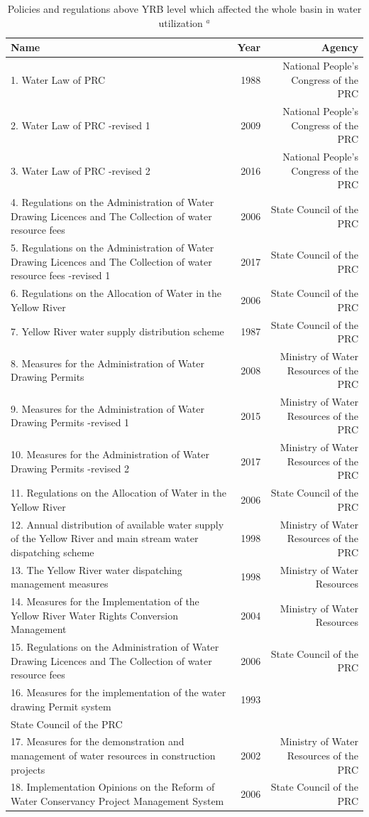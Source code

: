 \documentclass[9pt,twoside,lineno]{pnas-new}
\begin{document}
\begin{table}\centering
    \caption{Policies and regulations above YRB level which affected the whole basin in water utilization $^a$}
    
    \begin{tabular}{lrr}
    Name & Year & Agency \\
    \midrule
    1. Water Law of PRC & 1988 & National People's Congress of the PRC \\
    2. Water Law of PRC -revised 1 & 2009 & National People's Congress of the PRC \\
    3. Water Law of PRC -revised 2 & 2016 & National People's Congress of the PRC \\
    4. Regulations on the Administration of Water Drawing Licences and The Collection of water resource fees & 2006 & State Council of the PRC \\
    5. Regulations on the Administration of Water Drawing Licences and The Collection of water resource fees -revised 1 & 2017 & State Council of the PRC \\
    6. Regulations on the Allocation of Water in the Yellow River & 2006 & State Council of the PRC \\
    7. Yellow River water supply distribution scheme & 1987 & State Council of the PRC \\
    8. Measures for the Administration of Water Drawing Permits & 2008 & Ministry of Water Resources of the PRC \\
    9. Measures for the Administration of Water Drawing Permits -revised 1 & 2015 & Ministry of Water Resources of the PRC \\
    10. Measures for the Administration of Water Drawing Permits -revised 2 & 2017 & Ministry of Water Resources of the PRC \\
    11. Regulations on the Allocation of Water in the Yellow River & 2006 & State Council of the PRC \\
    12. Annual distribution of available water supply of the Yellow River and main stream water dispatching scheme & 1998 & Ministry of Water Resources of the PRC \\
    13. The Yellow River water dispatching management measures & 1998 & Ministry of Water Resources \\
    14. Measures for the Implementation of the Yellow River Water Rights Conversion Management & 2004 & Ministry of Water Resources \\
    15. Regulations on the Administration of Water Drawing Licences and The Collection of water resource fees & 2006 & State Council of the PRC \\
    16. Measures for the implementation of the water drawing Permit system & 1993 \\ State Council of the PRC \\
    17. Measures for the demonstration and management of water resources in construction projects & 2002 & Ministry of Water Resources of the PRC \\
    18. Implementation Opinions on the Reform of Water Conservancy Project Management System & 2006 & State Council of the PRC \\


\end{tabular}
\end{table}
\end{document}
